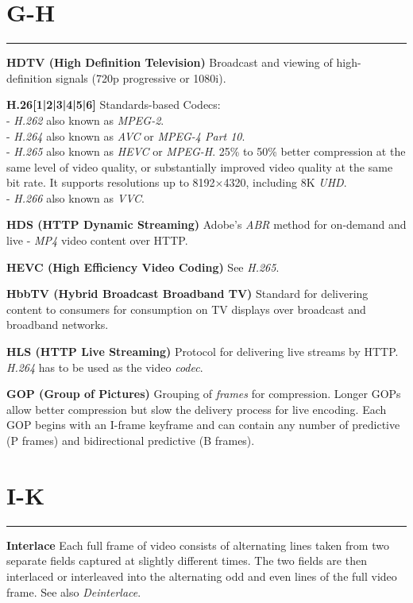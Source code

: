 \section{G-H}
\hrule

\medskip
\textbf{HDTV (High Definition Television)}
Broadcast and viewing of high-definition signals (720p progressive or 1080i).

\smallskip
\textbf{H.26[1|2|3|4|5|6]}
Standards-based Codecs:\\
 - \textit{H.262} also known as \textit{MPEG-2}.\\
 - \textit{H.264} also known as \textit{AVC} or  \textit{MPEG-4 Part 10}.\\
 - \textit{H.265} also known as \textit{HEVC} or \textit{MPEG-H}. 25\% to 50\% better compression at the same level of video quality, or substantially improved video quality at the same bit rate. It supports resolutions up to 8192×4320, including 8K \textit{UHD}.\\
 - \textit{H.266} also known as \textit{VVC}.

\smallskip
\textbf{HDS (HTTP Dynamic Streaming)}
Adobe's \textit{ABR} method for on-demand and live - \textit{MP4} video content over HTTP.

\smallskip
\textbf{HEVC (High Efficiency Video Coding)}
See \textit{H.265}.

\smallskip
\textbf{HbbTV (Hybrid Broadcast Broadband TV)}
Standard for delivering content to consumers for consumption on TV displays over broadcast and broadband networks.

\smallskip
\textbf{HLS (HTTP Live Streaming)}
Protocol for delivering live streams by HTTP.  \textit{H.264} has to be used as the video \textit{codec}.

\smallskip
\textbf{GOP (Group of Pictures)}
Grouping of \textit{frames} for compression. Longer GOPs allow better compression but slow the delivery process for live encoding. Each GOP begins with an I-frame keyframe and can contain any number of predictive (P frames) and bidirectional predictive (B frames).


\section{I-K}
\hrule

\medskip
\textbf{Interlace}
Each full frame of video consists of alternating lines taken from two separate fields captured at slightly different times. The two fields are then interlaced or interleaved into the alternating odd and even lines of the full video frame.  See also \textit{Deinterlace}.


